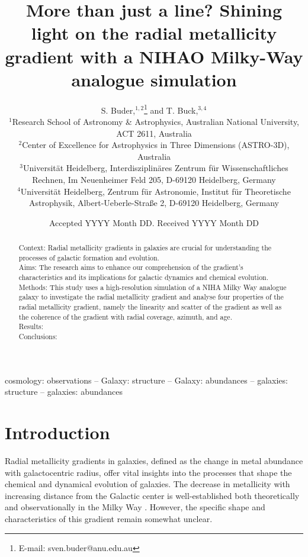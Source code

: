 \documentclass[fleqn,usenatbib]{mnras}
\title[NIHAO vs. Milky Way: Radial metallicity gradients]{More than just a line? Shining light on the radial metallicity gradient with a NIHAO Milky-Way analogue simulation}
\author[S. Buder and T. Buck]{
S. Buder,$^{1,2}$\thanks{E-mail: sven.buder@anu.edu.au} and
T. Buck,$^{3,4}$
\\
$^{1}$Research School of Astronomy \& Astrophysics, Australian National University, ACT 2611, Australia\\
$^{2}$Center of Excellence for Astrophysics in Three Dimensions (ASTRO-3D), Australia\\
$^{3}$Universit{\"a}t Heidelberg, Interdisziplin{\"a}res Zentrum f{\"u}r Wissenschaftliches Rechnen, Im Neuenheimer Feld 205, D-69120 Heidelberg, Germany\\
$^{4}$Universit{\"a}t Heidelberg, Zentrum f{\"u}r Astronomie, Institut f{\"u}r Theoretische Astrophysik, Albert-Ueberle-Straße 2, D-69120 Heidelberg, Germany
}
\date{Accepted YYYY Month DD. Received YYYY Month DD}
\begin{document}
\label{firstpage}
\pagerange{\pageref{firstpage}--\pageref{lastpage}}
\maketitle

\begin{abstract} %
Context: Radial metallicity gradients in galaxies are crucial for understanding the processes of galactic formation and evolution. \\
Aims: The research aims to enhance our comprehension of the gradient's characteristics and its implications for galactic dynamics and chemical evolution. \\
Methods: This study uses a high-resolution simulation of a NIHA Milky Way analogue galaxy to investigate the radial metallicity gradient and analyse four properties of the radial metallicity gradient, namely the linearity and scatter of the gradient as well as the coherence of the gradient with radial coverage, azimuth, and age. \\
Results: \\
Conclusions: \\
\end{abstract}
\begin{keywords}
cosmology: observations -- Galaxy: structure -- Galaxy: abundances  -- galaxies: structure -- galaxies: abundances
\end{keywords}



\section{Introduction}
\label{sec:intro}

Radial metallicity gradients in galaxies, defined as the change in metal abundance with galactocentric radius, offer vital insights into the processes that shape the chemical and dynamical evolution of galaxies. The decrease in metallicity with increasing distance from the Galactic center is well-established both theoretically \citep{Larson1976, Tinsley1980, Chiosi1980} and observationally in the Milky Way \citep{Searle1971, Janes1979, Twarog1997}. However, the specific shape and characteristics of this gradient remain somewhat unclear.
\end{document}
